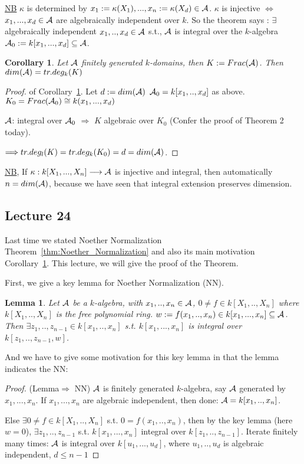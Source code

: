 \documentclass[11pt]{article}
\newtheorem{lemma}[thm]{Lemma}
\newtheorem{cor}[thm]{Corollary}
\newcommand{\cala}{{\cal A}}
\newcommand{\Lrta}{\Longrightarrow}
\newcommand{\lrta}{\longrightarrow}
\newcommand{\Llrta}{\Longleftrightarrow}
\begin{document}
\underline{NB} $\kappa$ is determined by $x_1:=\kappa(X_1),...,x_n:=\kappa(X_d)\in\cala$. $\kappa $ is injective $\Llrta$ $x_1,...,x_d\in \cala$ are algebraically independent over $k$.  So the theorem says : $\exists$ algebraically independent $x_1,..,x_d\in \cala$ s.t., $\cala$ is integral over the $k$-algebra $\cala_0:=k[x_1,...,x_d]\subseteq \cala$.
\begin{cor}\label{cor:k-domain_dim_tr.deg}
Let $\cala$ finitely generated $k$-domains, then $K:=Frac(\cala)$. Then $dim(\cala)=tr.deg_k(K)$
\end{cor}
\begin{proof} of Corollary~\ref{cor:k-domain_dim_tr.deg}. Let $d:=dim(\cala)$ $\cala_0=k[x_1,..,x_d]$ as above. 
$K_0=Frac(\cala_0)\cong k(x_1,...,x_d)$

$\cala$: integral over $\cala_0$ $\Lrta$ $K$ algebraic over $K_0$ (Confer the proof of Theorem 2 today).

$\Lrta tr.deg_l(K)=tr.deg_k(K_0)=d=dim(\cala)$.
\end{proof}
\underline{NB}, If $\kappa: k[X_1,...,X_n]\lrta\cala$ is injective and integral, then automatically $n=dim(\cala)$, because we have seen that integral extension preserves dimension.


\subsection{Lecture 24}
Last time we stated Noether Normalization Theorem~\ref{thm:Noether_Normalization} and also its main motivation Corollary~\ref{cor:k-domain_dim_tr.deg}. This lecture, we will give the proof of the Theorem.

First, we give a key lemma for Noether Normalization (NN).
\begin{lemma}\label{lem:key_lemma_noether_normalization}
Let $\cala$ be a $k$-algebra, with $x_1,..,x_n\in \cala$, $0\neq f\in k[X_1,..,X_n]$ where $k[X_1,..,X_n]$ is the free polynomial ring. $w:=f(x_1,..,x_n)\in k[x_1,...,x_n]\subseteq \cala$. Then $\exists z_1,..,z_{n-1}\in k[x_1,..,x_n]$ s.t. $k[x_1,...,x_n]$ is integral over $k[z_1,..,z_{n-1},w]$.
\end{lemma}

And we have to give some motivation for this key lemma in that the lemma indicates the NN:
\begin{proof}(Lemma$\Lrta$ NN) $\cala$ is finitely generated $k$-algebra, say $\cala$ generated by $x_1,...,x_n$. If $x_1,...,x_n$ are algebraic independent, then done: $\cala=k[x_1,..,x_n]$. 

Else $\exists 0\neq f\in k[X_1,..,X_n]$ s.t. $0=f(x_1,..,x_n)$, then by the key lemma (here $w=0$), $\exists z_1,..,z_{n-1}$ s.t. $k[x_1,...,x_n]$ integral over $k[z_1,..,z_{n-1}]$. Iterate finitely many times: $\cala$ is integral over $k[u_1,...,u_d]$, where $u_1,..,u_d$ is algebraic independent, $d\leq n-1$ 
\end{proof}
\end{document}
